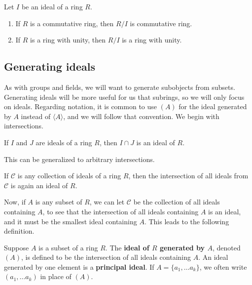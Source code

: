 \begin{theorem}\label{thm.CommutativityPassestoQuotients}
Let $I$ be an ideal of a ring $R$.
\begin{enumerate}
\item If $R$ is a commutative ring, then $R/I$ is commutative ring.
\item If $R$ is a ring with unity, then $R/I$ is a ring with unity.
\end{enumerate}
\end{theorem}

\subsection{Generating ideals}

As with groups and fields, we will want to generate subobjects from subsets. Generating ideals will be more useful for us that subrings, so we will only focus on ideals. Regarding notation, it is common to use $(A)$ for the ideal generated by $A$ instead of $\langle A \rangle$, and we will follow that convention. We begin with intersections.

\begin{theorem}
If $I$ and $J$ are ideals of a ring $R$, then $I\cap J$ is an ideal of $R$.
\end{theorem}

This can be generalized to arbitrary intersections. 

\begin{theorem}
If $\mathcal{C}$ is any collection of ideals of a ring $R$, then the intersection of all ideals from $\mathcal{C}$ is again an ideal of $R$.
\end{theorem}

Now, if $A$ is any subset of $R$, we can let $\mathcal{C}$ be the collection of all ideals containing $A$, to see that the intersection of all ideals containing $A$ is an ideal, and it must be the smallest ideal containing $A$. This leads to the following definition. 

\begin{definition}
Suppose $A$ is a subset of a ring $R$. The \textbf{ideal of $R$ generated by $A$}, denoted $(A)$, is defined to be the intersection of all ideals containing $A$.   An ideal generated by one element is a \textbf{principal ideal}. If $A = \{a_1,\ldots a_k\}$, we often write $(a_1,\ldots a_k)$ in place of $(A)$.
\end{definition}

